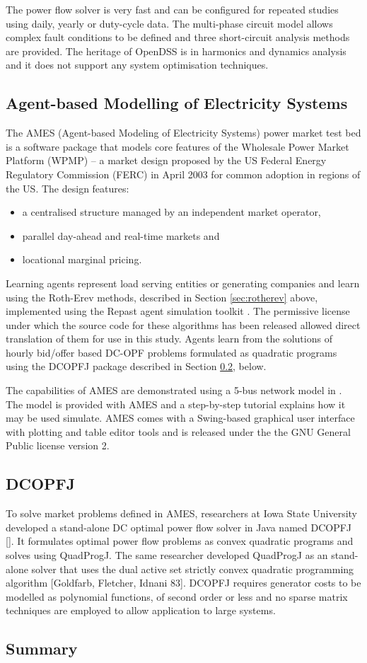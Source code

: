 The power flow solver is very fast and can be configured for repeated studies
using daily, yearly or duty-cycle data.  The multi-phase circuit model allows
complex fault conditions to be defined and three short-circuit analysis methods
are provided.  The heritage of OpenDSS is in harmonics and dynamics analysis
and it does not support any system optimisation techniques.

\subsection{Agent-based Modelling of Electricity Systems}
\label{sec:ames}
The AMES (Agent-based Modeling of Electricity Systems) power market test bed is
a software package that models core features of the Wholesale Power Market
Platform (WPMP) -- a market design proposed by the US Federal Energy Regulatory
Commission (FERC) in April 2003 for common adoption in regions of the
US\cite{tesfatsi:wpmp}. The design features:
\begin{itemize}
  \item a centralised structure managed by an independent market operator,
  \item parallel day-ahead and real-time markets and
  \item locational marginal pricing.
\end{itemize}
Learning agents represent load serving entities or generating companies and
learn using the Roth-Erev methods, described in Section \ref{sec:rotherev}
above, implemented using the Repast agent simulation toolkit
\cite{gieseler:thesis}.  The permissive license under which the source code for
these algorithms has been released allowed direct translation of them for use
in this study.  Agents learn from the solutions of hourly bid/offer based
DC-OPF problems formulated as quadratic programs using the DCOPFJ package
\cite{tesfatsi:dcopf} described in Section \ref{sec:dcopfj}, below.

The capabilities of AMES are demonstrated using a 5-bus network model in
\cite{tesfatsi:pes09}.  The model is provided with AMES and a step-by-step
tutorial explains how it may be used simulate.  AMES comes with a
Swing-based graphical user interface with plotting and table editor tools and
is released under the the GNU General Public license version 2.

\subsection{DCOPFJ}
\label{sec:dcopfj}
To solve market problems defined in AMES, researchers at Iowa State University
developed a stand-alone DC optimal power flow solver in Java named DCOPFJ [].
It formulates optimal power flow problems as convex quadratic programs and
solves using QuadProgJ.  The same researcher developed QuadProgJ as an
stand-alone solver that uses the dual active set strictly convex quadratic
programming algorithm [Goldfarb, Fletcher, Idnani 83].  DCOPFJ requires
generator costs to be modelled as polynomial functions, of second order or
less and no sparse matrix techniques are employed to allow application to large
systems.


\subsection{Summary}
